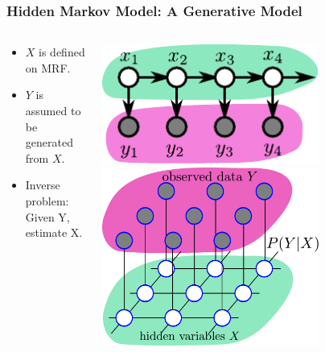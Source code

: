 \documentclass[sansserif, 10pt]{beamer}
\begin{document}
\begin{frame}
  \frametitle{Hidden Markov Model: A Generative Model}
  \begin{columns}
    \begin{column}{0.5\textwidth}
      \begin{block}{}
        \begin{itemize}
          \item $X$ is defined on MRF. 
          \item $Y$ is assumed to be generated from $X$.
          \item Inverse problem: Given Y, estimate X.
        \end{itemize}
      \end{block}
    \end{column}

    \begin{column}{0.5\textwidth}
      \centering
      \includegraphics[width = 0.7\textwidth]{sfig/hmm_chain}\\
      \vspace{5mm}
      \includegraphics[width=0.7\textwidth]{sfig/hmm}      
    \end{column}
  \end{columns}


\end{frame}
\end{document}

